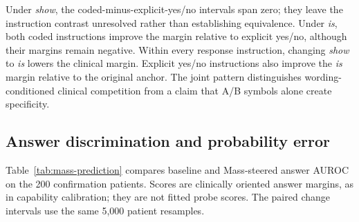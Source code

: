 Under \textit{show}, the coded-minus-explicit-yes/no intervals span zero;
they leave the instruction contrast unresolved rather than establishing
equivalence. Under \textit{is}, both coded instructions improve the margin
relative to explicit yes/no, although their margins remain negative.
Within every response instruction, changing \textit{show} to \textit{is} lowers the
clinical margin. Explicit yes/no instructions also improve the
\textit{is} margin relative to the original anchor.
The joint pattern distinguishes wording-conditioned clinical competition
from a claim that A/B symbols alone create specificity.

\subsection{Answer discrimination and probability error}

Table~\ref{tab:mass-prediction} compares baseline and Mass-steered answer
AUROC on the 200 confirmation patients. Scores are clinically oriented
answer margins, as in capability calibration; they are not fitted probe
scores. The paired change intervals use the same 5,000 patient resamples.

\begin{table}[H]
\centering
\caption{Mass steering and answer discrimination.}
\label{tab:mass-prediction}
\end{table}

